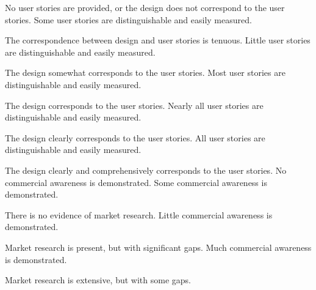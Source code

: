\documentclass{../fal_assignment}
\begin{document}
\begin{markingrubric}
            		
        \grade\fail No user stories are provided, or the design does not correspond to the user stories.
        \grade Some user stories are distinguishable and easily measured.
            \par The correspondence between design and user stories is tenuous.
        \grade Little user stories are distinguishable and easily measured.
            \par The design somewhat corresponds to the user stories.
        \grade Most user stories are distinguishable and easily measured.
            \par The design corresponds to the user stories.
        \grade Nearly all user stories are distinguishable and easily measured.
            \par The design clearly corresponds to the user stories.
        \grade All user stories are distinguishable and easily measured.
            \par The design clearly and comprehensively corresponds to the user stories.
        \grade\fail No commercial awareness is demonstrated.
        \grade Some commercial awareness is demonstrated.
            \par There is no evidence of market research.
        \grade Little commercial awareness is demonstrated.
            \par Market research is present, but with significant gaps.
        \grade Much commercial awareness is demonstrated.
            \par Market research is extensive, but with some gaps.

\end{markingrubric}
\end{document}
